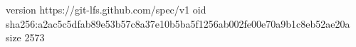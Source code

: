 version https://git-lfs.github.com/spec/v1
oid sha256:a2ac5c5dfab89e53b57c8a37e10b5ba5f1256ab002fe00e70a9b1c8eb52ae20a
size 2573
